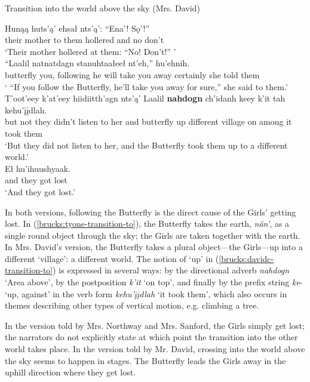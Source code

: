 \begin{exe}
\ex Transition into the world above the sky (Mrs. David) \label{brucks:davidc-transition-to}
\begin{xlist}

\ex \gll Hunąą huts'ą' ehsał nts'ą': ``Ena'! Sǫ'!''  \\
 {their mother} {to them} hollered and no don't \\
\glt `Their mother hollered at them: ``No! Don't!'' ' \\

\ex \gll ``Laalil natnatdagn stanuhtaałeeł nt'eh,'' hu'ehnih.  \\
 butterfly {you, following} {he will take you away} certainly {she told them} \\
\glt ` ``If you follow the Butterfly, he'll take you away for sure,'' she said to them.' \\

\ex \gll T'oot'eey k'at'eey hiidiitth'agn nts'ą' Laalil \textbf{nahdogn} ch'idanh keey k'it tah kehu'įįdlah.  \\
 but not {they didn't listen to her} and butterfly up different village on among {it took them} \\
\glt `But they did not listen to her, and the Butterfly took them up to a different world.' \\

\ex \gll Eł hu'ihuushyaak.  \\
 and {they got lost} \\
\glt `And they got lost.' \\
\end{xlist}
\end{exe}

In both versions, following the Butterfly is the direct cause of the Girls' getting lost. In (\ref{brucks:tyone-transition-to}), the Butterfly takes the earth, {\em nän'}, as a single round object through the sky; the Girls are taken together with the earth. In Mrs. David's version, the Butterfly takes a plural object—the Girls—up into a different `village': a different world. The notion of `up' in (\ref{brucks:davidc-transition-to}) is expressed in several ways: by the directional adverb {\em nahdogn} `Area above', by the postposition {\em k'it} `on top', and finally by the prefix string {\em ke}- `up, against' in the verb form {\em kehu'įįdlah} `it took them', which also occurs in themes describing other types of vertical motion, e.g. climbing a tree.

In the version told by Mrs. Northway and Mrs. Sanford, the Girls simply get lost; the narrators do not explicitly state at which point the transition into the other world takes place. In the version told by Mr. David, crossing into the world above the sky seems to happen in stages. The Butterfly leads the Girls away in the uphill direction where they get lost.

